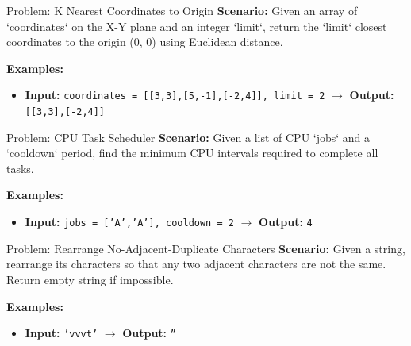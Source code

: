 \begin{frame}[fragile]{Problem: K Nearest Coordinates to Origin}
  \textbf{Scenario:}
  Given an array of `coordinates` on the X-Y plane and an integer `limit`, return the `limit` closest coordinates to the origin (0, 0) using Euclidean distance.
  
  \vspace{0.3cm}
  \textbf{Examples:}
  \begin{itemize}
    \item \textbf{Input:} \texttt{coordinates = [[3,3],[5,-1],[-2,4]], limit = 2} $\rightarrow$ \textbf{Output:} \texttt{[[3,3],[-2,4]]}
  \end{itemize}
\end{frame}

\begin{frame}[fragile]{Problem: CPU Task Scheduler}
  \textbf{Scenario:}
  Given a list of CPU `jobs` and a `cooldown` period, find the minimum CPU intervals required to complete all tasks.
  
  \vspace{0.3cm}
  \textbf{Examples:}
  \begin{itemize}
    \item \textbf{Input:} \texttt{jobs = ['A','A'], cooldown = 2} $\rightarrow$ \textbf{Output:} \texttt{4}
  \end{itemize}
\end{frame}

\begin{frame}[fragile]{Problem: Rearrange No-Adjacent-Duplicate Characters}
  \textbf{Scenario:}
  Given a string, rearrange its characters so that any two adjacent characters are not the same. Return empty string if impossible.
  
  \vspace{0.3cm}
  \textbf{Examples:}
  \begin{itemize}
    \item \textbf{Input:} \texttt{'vvvt'} $\rightarrow$ \textbf{Output:} \texttt{''}
  \end{itemize}
\end{frame}
